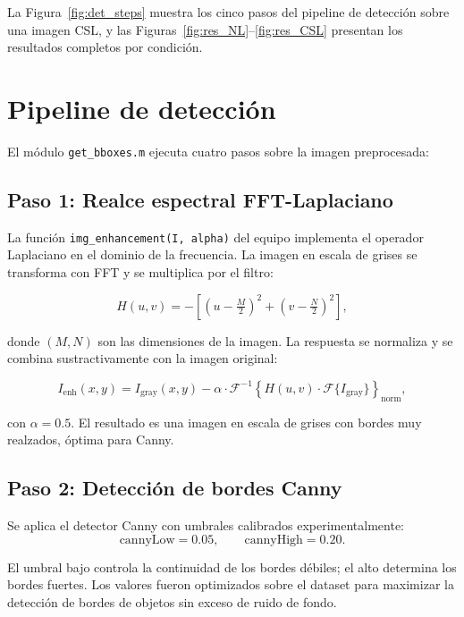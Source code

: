 \documentclass[11pt,a4paper]{article}
\begin{document}
La Figura~\ref{fig:det_steps} muestra los cinco pasos del pipeline de detección
sobre una imagen CSL, y las Figuras~\ref{fig:res_NL}--\ref{fig:res_CSL}
presentan los resultados completos por condición.

\section{Pipeline de detección}
\label{sec:detection}

El módulo \texttt{get\_bboxes.m} ejecuta cuatro pasos sobre la imagen preprocesada:

\subsection{Paso 1: Realce espectral FFT-Laplaciano}

La función \texttt{img\_enhancement(I, alpha)} del equipo implementa el operador
Laplaciano en el dominio de la frecuencia. La imagen en escala de grises se transforma
con FFT y se multiplica por el filtro:

\begin{equation}
    H(u,v) = -\!\left[\left(u - \tfrac{M}{2}\right)^2 + \left(v - \tfrac{N}{2}\right)^2\right],
\end{equation}

donde $(M, N)$ son las dimensiones de la imagen. La respuesta se normaliza y se
combina sustractivamente con la imagen original:

\begin{equation}
    I_{\text{enh}}(x,y) = I_{\text{gray}}(x,y) - \alpha \cdot \mathcal{F}^{-1}\!\left\{H(u,v)\cdot\mathcal{F}\{I_{\text{gray}}\}\right\}_{\text{norm}},
\end{equation}

con $\alpha = 0.5$. El resultado es una imagen en escala de grises con bordes
muy realzados, óptima para Canny.

\subsection{Paso 2: Detección de bordes Canny}

Se aplica el detector Canny con umbrales calibrados experimentalmente:
\begin{equation}
    \text{cannyLow} = 0.05, \qquad \text{cannyHigh} = 0.20.
\end{equation}

El umbral bajo controla la continuidad de los bordes débiles; el alto determina los
bordes fuertes. Los valores fueron optimizados sobre el dataset para maximizar la
detección de bordes de objetos sin exceso de ruido de fondo.
\end{document}
